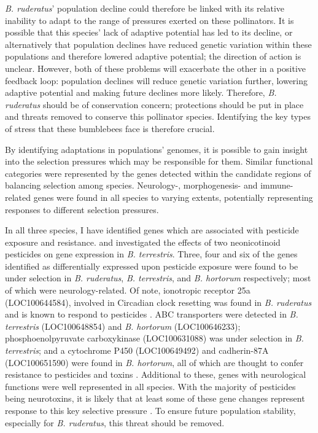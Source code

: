 \documentclass[12pt]{article}
\begin{document}
\begin{linenumbers}
    	\emph{B. ruderatus}' population decline could therefore be linked with its relative inability to adapt to the range of pressures exerted on these pollinators. It is possible that this species' lack of adaptive potential has led to its decline, or alternatively that population declines have reduced genetic variation within these populations and therefore lowered adaptive potential; the direction of action is unclear. However, both of these problems will exacerbate the other in a positive feedback loop: population declines will reduce genetic variation further, lowering adaptive potential and making future declines more likely. Therefore, \emph{B. ruderatus} should be of conservation concern; protections should be put in place and threats removed to conserve this pollinator species. Identifying the key types of stress that these bumblebees face is therefore crucial.
    	
		
		By identifying adaptations in populations' genomes, it is possible to gain insight into the selection pressures which may be responsible for them.
		Similar functional categories were represented by the genes detected within the candidate regions of balancing selection among species. 
		Neurology-, morphogenesis- and immune-related genes were found in all species to varying extents, potentially representing responses to different selection pressures.
		
		In all three species, I have identified genes which are associated with pesticide exposure and resistance. 
		\cite{bebane_effects_2019} and \cite{colgan_caste-_2019} investigated the effects of two neonicotinoid pesticides on gene expression in \emph{B. terrestris}. 
		Three, four and six of the genes identified as differentially expressed upon pesticide exposure were found to be under selection in \emph{B. ruderatus}, \emph{B. terrestris}, and \emph{B. hortorum} respectively; most of which were neurology-related. Of note, ionotropic receptor 25a (LOC100644584), involved in Circadian clock resetting was found in \emph{B. ruderatus} and is known to respond to pesticides \citep{chen_drosophila_2015}. ABC transporters were detected in \emph{B. terrestris} (LOC100648854) and \emph{B. hortorum} (LOC100646233); phosphoenolpyruvate carboxykinase (LOC100631088) was under selection in \emph{B. terrestris}; and a cytochrome P450 (LOC100649492) and cadherin-87A (LOC100651590) were found in \emph{B. hortorum}, all of which are thought to confer resistance to pesticides and toxins \citep{bebane_effects_2019, colgan_caste-_2019, haas_phylogenomic_2022}.
		Additional to these, genes with neurological functions were well represented in all species. With the majority of pesticides being neurotoxins, it is likely that at least some of these gene changes represent response to this key selective pressure  \citep{siviter_quantifying_2018}. To ensure future population stability, especially for \emph{B. ruderatus}, this threat should be removed.
		

\end{linenumbers}
\end{document}
